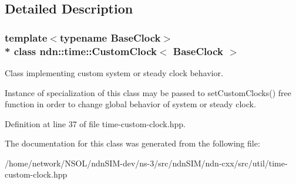 \subsection{Detailed Description}
\subsubsection*{template$<$typename Base\+Clock$>$\\*
class ndn\+::time\+::\+Custom\+Clock$<$ Base\+Clock $>$}

Class implementing custom system or steady clock behavior. 

Instance of specialization of this class may be passed to set\+Custom\+Clocks() free function in order to change global behavior of system or steady clock. 

Definition at line 37 of file time-\/custom-\/clock.\+hpp.



The documentation for this class was generated from the following file\+:\begin{DoxyCompactItemize}
\item 
/home/network/\+N\+S\+O\+L/ndn\+S\+I\+M-\/dev/ns-\/3/src/ndn\+S\+I\+M/ndn-\/cxx/src/util/time-\/custom-\/clock.\+hpp\end{DoxyCompactItemize}
